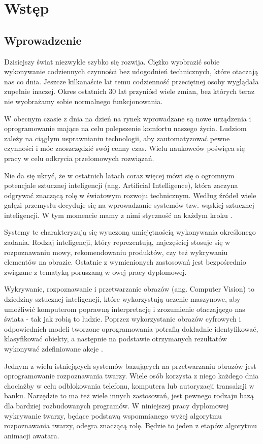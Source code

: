 \chapter{Wstęp}
\label{cha:wstep}

\section{Wprowadzenie}
Dzisiejszy świat niezwykle szybko się rozwija. Ciężko wyobrazić sobie wykonywanie codziennych czynności bez udogodnień technicznych, które otaczają nas co dnia. Jeszcze kilkanaście lat temu codzienność przeciętnej 
osoby wyglądała zupełnie inaczej. Okres ostatnich 30 lat przyniósł wiele zmian, bez których teraz nie wyobrażamy sobie normalnego funkcjonowania.

W obecnym czasie z dnia na dzień na rynek wprowadzane są nowe urządzenia i oprogramowanie mające na celu polepszenie komfortu naszego życia. Ludziom zależy na ciągłym usprawnianiu technologii, aby zautomatyzować pewne czynności i móc zaoszczędzić swój cenny czas. Wielu naukowców poświęca się pracy w celu odkrycia przełomowych rozwiązań.

Nie da się ukryć, że w ostatnich latach coraz więcej mówi się o ogromnym potencjale sztucznej inteligencji (ang. Artificial Intelligence), która zaczyna odgrywać znaczącą rolę w światowym rozwoju technicznym. Według źródeł wiele gałęzi przemysłu decyduje się na wprowadzanie systemów tzw. wąskiej sztucznej inteligencji. W tym momencie mamy z nimi styczność na każdym kroku \cite{ai}.   

Systemy te charakteryzują się wyuczoną umiejętnością wykonywania określonego zadania. Rodzaj inteligencji, który reprezentują, najczęściej stosuje się w rozpoznawaniu mowy, rekomendowaniu produktów, czy też wykrywaniu elementów na obrazie. Ostatnie z wymienionych zastosowań jest bezpośrednio związane z tematyką poruszaną w owej pracy dyplomowej.

Wykrywanie, rozpoznawanie i przetwarzanie obrazów (ang. Computer Vision) to dziedziny sztucznej inteligencji, które wykorzystują uczenie maszynowe, aby umożliwić komputerom poprawną interpretację i zrozumienie otaczająego nas świata - tak jak robią to ludzie. Poprzez wykorzystanie obrazów cyfrowych i odpowiednich modeli tworzone oprogramowania potrafią dokładnie identyfikować, klasyfikować obiekty, a następnie na podstawie otrzymanych rezultatów wykonywać zdefiniowane akcje \cite{computervision}.

Jednym z wielu istniejących systemów bazujących na przetwarzaniu obrazów jest oprogramowanie rozpoznawania twarzy. Wiele osób korzysta z niego każdego dnia chociażby w celu odblokowania telefonu, komputera lub autoryzacji transakcji w banku. Narzędzie to ma też wiele innych zastosowań, jest pewnego rodzaju bazą dla bardziej rozbudowanych programów. W niniejszej pracy dyplomowej wykrywanie twarzy, będące podstawą wspomnianego wyżej algorytmu rozpoznawania twarzy, odegra znaczącą rolę. Będzie to jeden z etapów algorytmu animacji awatara.

